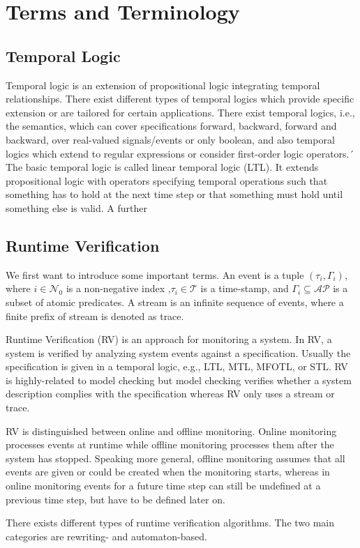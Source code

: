 
\section{Terms and Terminology}


\subsection{Temporal Logic}
Temporal logic is an extension of propositional logic integrating temporal relationships.
There exist different types of temporal logics which provide specific extension or are tailored for certain applications.
There exist temporal logics, i.e., the semantics, which can cover specifications forward, backward, forward and backward, over real-valued signals/events or only boolean, and also temporal logics which extend to regular expressions or consider first-order logic operators.´
The basic temporal logic is called linear temporal logic (LTL).
It extends propositional logic with operators specifying temporal operations such that something has to hold at the next time step or that something must hold until something else is valid.
A further 

\subsection{Runtime Verification}
We first want to introduce some important terms.
An event is a tuple $(\tau_i, \Gamma_i)$, where $i \in \mathcal{N}_0$ is a non-negative index ,$\tau_i \in \mathcal{T}$ is a time-stamp, and $ \Gamma_i \subseteq \mathcal{AP}$ is a subset of atomic predicates.
A stream is an infinite sequence of events, where a finite prefix of stream is denoted as trace.

Runtime Verification (RV) is an approach for monitoring a system.
In RV, a system is verified by analyzing system events against a specification.
Usually the specification is given in a temporal logic, e.g., LTL, MTL, MFOTL, or STL.
RV is highly-related to model checking but model checking verifies whether a system description complies with the specification whereas RV only uses a stream or trace.

RV is distinguished between online and offline monitoring. 
Online monitoring processes events at runtime while offline monitoring processes them after the system has stopped.
Speaking more general, offline monitoring assumes that all events are given or could be created when the monitoring starts, whereas in online monitoring events for a future time step can still be undefined at a previous time step, but have to be defined later on.


There exists different types of runtime verification algorithms.
The two main categories are rewriting- and automaton-based.